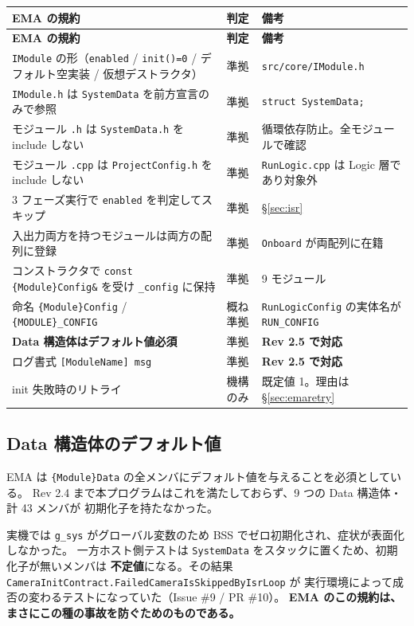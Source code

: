 \documentclass[a4paper,11pt,dvipdfmx]{jsarticle}
\begin{document}
\begin{longtable}{p{66mm} l p{56mm}}
\toprule
\textbf{EMA の規約} & \textbf{判定} & \textbf{備考} \\
\midrule
\endfirsthead
\toprule
\textbf{EMA の規約} & \textbf{判定} & \textbf{備考} \\
\midrule
\endhead
\texttt{IModule} の形（\texttt{enabled} / \texttt{init()=0} /
  デフォルト空実装 / 仮想デストラクタ） & 準拠 & \texttt{src/core/IModule.h} \\
\texttt{IModule.h} は \texttt{SystemData} を前方宣言のみで参照 & 準拠 &
  \texttt{struct SystemData;} \\
モジュール \texttt{.h} は \texttt{SystemData.h} を include しない & 準拠 & 循環依存防止。全モジュールで確認 \\
モジュール \texttt{.cpp} は \texttt{ProjectConfig.h} を include しない & 準拠 &
  \texttt{RunLogic.cpp} は Logic 層であり対象外 \\
3 フェーズ実行で \texttt{enabled} を判定してスキップ & 準拠 &
  \hyperref[sec:isr]{§\ref*{sec:isr}} \\
入出力両方を持つモジュールは両方の配列に登録 & 準拠 &
  \texttt{Onboard} が両配列に在籍 \\
コンストラクタで \texttt{const \{Module\}Config\&} を受け \texttt{\_config} に保持 & 準拠 & 9 モジュール \\
命名 \texttt{\{Module\}Config} / \texttt{\{MODULE\}\_CONFIG} & 概ね準拠 &
  \texttt{RunLogicConfig} の実体名が \texttt{RUN\_CONFIG} \\
\textbf{Data 構造体はデフォルト値必須} & 準拠 & \textbf{Rev 2.5 で対応} \\
ログ書式 \texttt{[ModuleName] msg} & 準拠 & \textbf{Rev 2.5 で対応} \\
init 失敗時のリトライ & 機構のみ & 既定値 1。理由は \hyperref[sec:emaretry]{§\ref*{sec:emaretry}} \\
\bottomrule
\end{longtable}

\subsection{Data 構造体のデフォルト値}

EMA は \texttt{\{Module\}Data} の全メンバにデフォルト値を与えることを必須としている。
Rev 2.4 まで本プログラムはこれを満たしておらず、9 つの Data 構造体・計 43 メンバが
初期化子を持たなかった。

\begin{cautionbox}[この違反は実際に不具合を起こしていた]
実機では \texttt{g\_sys} がグローバル変数のため BSS でゼロ初期化され、症状が表面化しなかった。
一方ホスト側テストは \texttt{SystemData} をスタックに置くため、初期化子が無いメンバは
\textbf{不定値}になる。その結果 \texttt{CameraInitContract.FailedCameraIsSkippedByIsrLoop} が
実行環境によって成否の変わるテストになっていた（Issue \#9 / PR \#10）。
\textbf{EMA のこの規約は、まさにこの種の事故を防ぐためのものである。}
\end{cautionbox}
\end{document}
